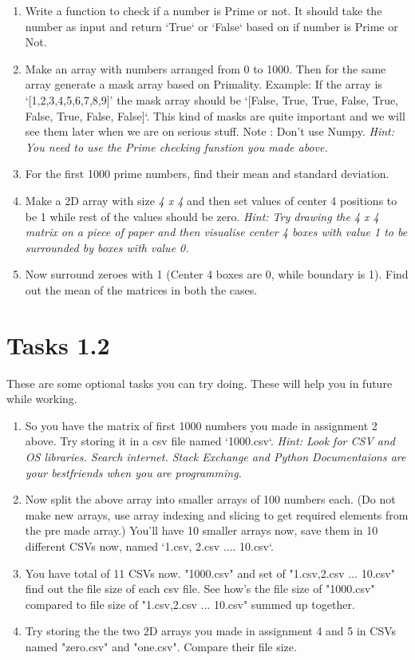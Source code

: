 \documentclass[a4paper]{article}
\begin{document}
\begin{enumerate}
    \item Write a function to check if a number is Prime or not. It should take the number as input and return `True` or `False` based on if number is Prime or Not.
    \item Make an array with numbers arranged from 0 to 1000. Then for the same array generate a mask array based on Primality. Example: If the array is `[1,2,3,4,5,6,7,8,9]' the mask array should be `[False, True, True, False, True, False, True, False, False]`. This kind of masks are quite important and we will see them later when we are on serious stuff. Note : Don't use Numpy.  \emph{Hint: You need to use the Prime checking funstion you made above.}
    \item For the first 1000 prime numbers, find their mean and standard deviation.
    \item Make a 2D array with size \emph{4 x 4} and then set values of center 4 positions to be 1 while rest of the values should be zero. \emph{Hint: Try drawing the 4 x 4 matrix on a piece of paper and then visualise center 4 boxes with value 1 to be surrounded by boxes with value 0.}
    \item Now surround zeroes with 1 (Center 4 boxes are 0, while boundary is 1). Find out the mean of the matrices in both the cases.
\end{enumerate}


\section{Tasks 1.2}
These are some optional tasks you can try doing. These will help you in future while working.
\begin{enumerate}
    \item So you have the matrix of first 1000 numbers you made in assignment 2 above. Try storing it in a csv file named `1000.csv`. \emph{Hint: Look for CSV and OS libraries. Search internet. Stack Exchange and Python Documentaions are your bestfriends when you are programming.}
    \item Now split the above array into smaller arrays of 100 numbers each. (Do not make new arrays, use array indexing and slicing to get required elements from the pre made array.) You'll have 10 smaller arrays now, save them in 10 different CSVs now, named `1.csv, 2.csv .... 10.csv`.
    \item You have total of 11 CSVs now.  "1000.csv" and set of "1.csv,2.csv ... 10.csv" find out the file size of each csv file. See how's the file size of "1000.csv" compared to file size of "1.csv,2.csv ... 10.csv" summed up together.
    \item Try storing the the two 2D arrays you made in assignment 4 and 5 in CSVs named "zero.csv" and "one.csv". Compare their file size. 
\end{enumerate}
\end{document}
